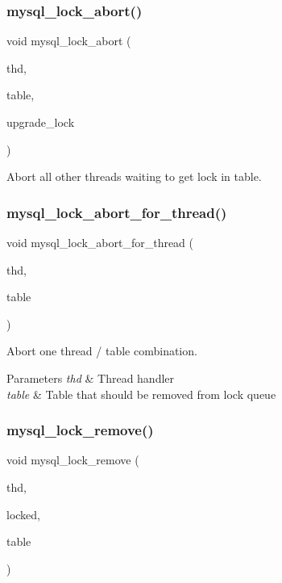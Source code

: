 \subsubsection{\texorpdfstring{mysql\+\_\+lock\+\_\+abort()}{mysql\_lock\_abort()}}
{\footnotesize\ttfamily void mysql\+\_\+lock\+\_\+abort (\begin{DoxyParamCaption}\item[{T\+HD $\ast$}]{thd,  }\item[{\mbox{\hyperlink{structTABLE}{T\+A\+B\+LE}} $\ast$}]{table,  }\item[{bool}]{upgrade\+\_\+lock }\end{DoxyParamCaption})}

Abort all other threads waiting to get lock in table. \mbox{\label{group__Locking_gad2320fa808c9d6523790e796d57e2331}} 
\subsubsection{\texorpdfstring{mysql\+\_\+lock\+\_\+abort\+\_\+for\+\_\+thread()}{mysql\_lock\_abort\_for\_thread()}}
{\footnotesize\ttfamily void mysql\+\_\+lock\+\_\+abort\+\_\+for\+\_\+thread (\begin{DoxyParamCaption}\item[{T\+HD $\ast$}]{thd,  }\item[{\mbox{\hyperlink{structTABLE}{T\+A\+B\+LE}} $\ast$}]{table }\end{DoxyParamCaption})}

Abort one thread / table combination.


\begin{DoxyParams}{Parameters}
{\em thd} & Thread handler \\
\hline
{\em table} & Table that should be removed from lock queue \\
\hline
\end{DoxyParams}
\mbox{\label{group__Locking_gad40fe56766e1b54e2fed60814aec1e58}} 
\subsubsection{\texorpdfstring{mysql\+\_\+lock\+\_\+remove()}{mysql\_lock\_remove()}}
{\footnotesize\ttfamily void mysql\+\_\+lock\+\_\+remove (\begin{DoxyParamCaption}\item[{T\+HD $\ast$}]{thd,  }\item[{\mbox{\hyperlink{structst__mysql__lock}{M\+Y\+S\+Q\+L\+\_\+\+L\+O\+CK}} $\ast$}]{locked,  }\item[{\mbox{\hyperlink{structTABLE}{T\+A\+B\+LE}} $\ast$}]{table }\end{DoxyParamCaption})}

